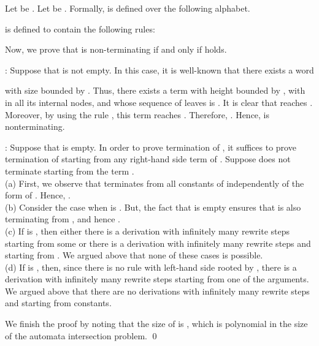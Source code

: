 \documentclass{LMCS}
\theoremstyle{plain}
\begin{document}
Let  be .
Let  be .
Formally,  is defined over the following alphabet.

 is defined to contain the following rules:

Now, we prove that
 is non-terminating if and only if
 holds.


:
Suppose that
 is not empty.
In this case, it is well-known that
there exists a word 
 
with size bounded by .
Thus, there exists a term  with height bounded
by , with  in all its internal nodes, and
whose sequence of leaves is .
It is clear that  reaches
.
Moreover, by using the rule ,
this term reaches . Therefore, . 
Hence,  is nonterminating.

: Suppose that 
 is empty.
In order to prove termination of ,
it suffices to prove termination of  starting from any 
right-hand side term of .
Suppose  does not terminate starting from the term .
\\
(a) First, we observe that  terminates from
all constants of  independently of
the form of . 
Hence, .
\\
(b) Consider the case when  is .
But, the fact that 
is empty ensures that  is also terminating from , and hence
.
\\
(c)
If  is , then either there is a derivation
with infinitely many rewrite steps
starting from some  or there is a derivation 
with infinitely many rewrite steps and starting
from .  We argued above that none of these cases is possible.
\\
(d)
If  is ,
then, since there is no rule with left-hand side rooted by ,
there is a derivation with infinitely many rewrite
steps starting from one of the arguments.
We argued above that there are no derivations
with infinitely many rewrite steps and starting from
constants.

We finish the proof by noting that the size of  is 
,
which is polynomial in the size 
of the automata intersection problem.
\qed
\end{document}
